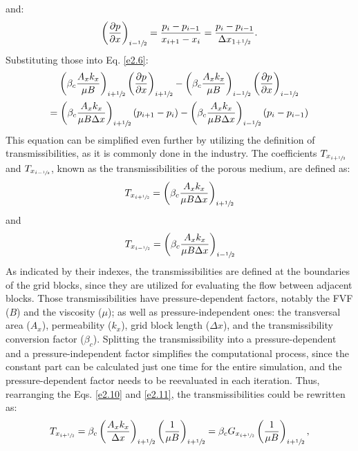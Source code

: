 and:
	\begin{align}
	\label{e2.8}
	\left(\frac{\partial p}{\partial x}\right)_{i-\sfrac{1}{2}}= \frac{p_i-p_{i-1}}{x_{i+1}-x_i}=\frac{p_i-p_{i-1}}{\Delta x_{1+\sfrac{1}{2}}} .
	\end{align}
Substituting those into Eq. \ref{e2.6}:
	\begin{multline}
	\label{e2.9}
	\left( \beta_c \frac{A_x k_x}{\mu B}\right)_{i+\sfrac{1}{2}} \left(\frac{\partial p}{\partial x}\right)_{i+\sfrac{1}{2}} - \left( \beta_c \frac{A_x k_x}{\mu B}\right)_{i-\sfrac{1}{2}} \left(\frac{\partial p}{\partial x}\right)_{i-\sfrac{1}{2}}\\ = \left( \beta_c \frac{A_x k_x}{\mu B \Delta x}\right)_{i+\sfrac{1}{2}} (p_{i+1}-p_i) - \left( \beta_c \frac{A_x k_x}{\mu B \Delta x}\right)_{i-\sfrac{1}{2}} (p_i-p_{i-1})
	\end{multline}
This equation can be simplified even further by utilizing the definition of transmissibilities, as it is commonly done in the industry. The coefficients $T_{x_{i+\sfrac{1}{2}}}$ and $T_{x_{i-\sfrac{1}{2}}}$, known as the transmissibilities of the porous medium, are defined as:
	\begin{align}
	\label{e2.10}
	T_{x_{i+\sfrac{1}{2}}}=\left( \beta_c \frac{A_x k_x}{\mu B \Delta x}\right)_{i+\sfrac{1}{2}}
	\end{align}
and
	\begin{align}
	\label{e2.11}
	T_{x_{i-\sfrac{1}{2}}}=\left( \beta_c \frac{A_x k_x}{\mu B \Delta x}\right)_{i-\sfrac{1}{2}}
	\end{align}
	\noindent
As indicated by their indexes, the transmissibilities are defined at the boundaries of the grid blocks, since they are utilized for evaluating the flow between adjacent blocks. Those transmissibilities have pressure-dependent factors, notably the FVF ($B$) and the viscosity ($\mu$); as well as pressure-independent ones: the transversal area ($A_x$), permeability ($k_x$), grid block length ($\Delta x$), and the transmissibility conversion factor ($\beta_c$). Splitting the transmissibility into a pressure-dependent and a pressure-independent factor simplifies the computational process, since the constant part can be calculated just one time for the entire simulation, and the pressure-dependent factor needs to be reevaluated in each iteration. Thus, rearranging the Eqs. \ref{e2.10} and \ref{e2.11}, the transmissibilities could be rewritten as:
\begin{align}
\label{e2.15}
T_{x_{i+\sfrac{1}{2}}}=\beta_c\left(\frac{A_x k_x}{\Delta x}\right)_{i+\sfrac{1}{2}} \left(\frac{1}{\mu B}\right)_{i+\sfrac{1}{2}}=\beta_c G_{x_{i+\sfrac{1}{2}}} \left(\frac{1}{\mu B}\right)_{i+\sfrac{1}{2}} ,
\end{align}
